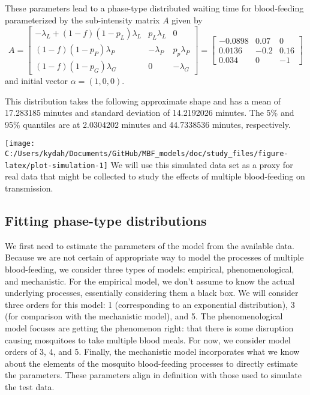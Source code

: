 \documentclass[
]{article}
\begin{document}
These parameters lead to a phase-type distributed waiting time for
blood-feeding parameterized by the sub-intensity matrix \(A\) given by
\[
A = \begin{bmatrix}-\lambda_{L}+\left(1-f\right)\left(1-p_{L}\right)\lambda_{L} & p_{L}\lambda_{L} & 0\\
\left(1-f\right)\left(1-p_{P}\right)\lambda_{P} & -\lambda_{P} & p_{p}\lambda_{P}\\
\left(1-f\right)\left(1-p_{G}\right)\lambda_{G} & 0 & -\lambda_{G}
\end{bmatrix}  = \begin{bmatrix} -0.0898 & 0.07 & 0\\
0.0136 & -0.2 & 0.16\\
0.034 & 0 & -1
\end{bmatrix}
\] and initial vector \(\alpha = \left(1,0,0\right)\).

This distribution takes the following approximate shape and has a mean
of 17.283185 minutes and standard deviation of 14.2192026 minutes. The
5\% and 95\% quantiles are at 2.0304202 minutes and 44.7338536 minutes,
respectively.

\texttt{[image: C:/Users/kydah/Documents/GitHub/MBF\_models/doc/study\_files/figure-latex/plot-simulation-1]}
We will use this simulated data set as a proxy for real data that might
be collected to study the effects of multiple blood-feeding on
transmission.

\hypertarget{fitting-phase-type-distributions}{%
\subsection{Fitting phase-type
distributions}\label{fitting-phase-type-distributions}}

We first need to estimate the parameters of the model from the available
data. Because we are not certain of appropriate way to model the
processes of multiple blood-feeding, we consider three types of models:
empirical, phenomenological, and mechanistic. For the empirical model,
we don't assume to know the actual underlying processes, essentially
considering them a black box. We will consider three orders for this
model: 1 (corresponding to an exponential distribution), 3 (for
comparison with the mechanistic model), and 5. The phenomenological
model focuses are getting the phenomenon right: that there is some
disruption causing mosquitoes to take multiple blood meals. For now, we
consider model orders of 3, 4, and 5. Finally, the mechanistic model
incorporates what we know about the elements of the mosquito
blood-feeding processes to directly estimate the parameters. These
parameters align in definition with those used to simulate the test
data.
\end{document}
